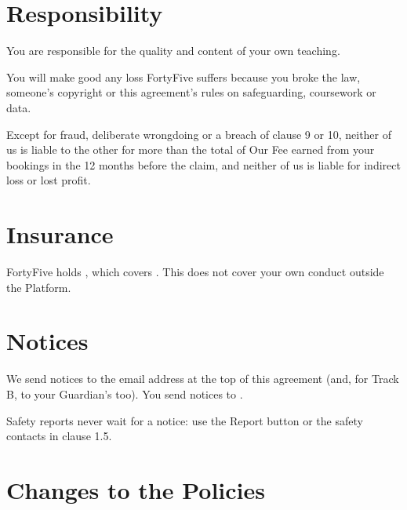 \documentclass[11pt]{article}
\begin{document}
\section{Responsibility}

\begin{clauses}
  \item You are responsible for the quality and content of your own teaching.
  \item You will make good any loss FortyFive suffers because you broke the law, someone's copyright or this agreement's rules on safeguarding, coursework or data.
  \item Except for fraud, deliberate wrongdoing or a breach of clause 9 or 10, neither of us is liable to the other for more than the total of Our Fee earned from your bookings in the 12 months before the claim, and neither of us is liable for indirect loss or lost profit.
\end{clauses}

\section{Insurance}

\begin{clauses}
  \item FortyFive holds , which covers . This does not cover your own conduct outside the Platform.
\end{clauses}

\section{Notices}

\begin{clauses}
  \item We send notices to the email address at the top of this agreement (and, for Track B, to your Guardian's too). You send notices to .
  \item Safety reports never wait for a notice: use the Report button or the safety contacts in clause 1.5.
\end{clauses}

\section{Changes to the Policies}
\end{document}
